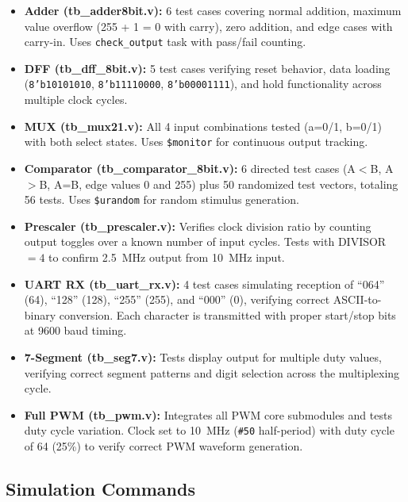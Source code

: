 \documentclass[12pt,a4paper]{article}
\begin{document}
\begin{itemize}
\item \textbf{Adder (tb\_adder8bit.v):} 6 test cases covering normal addition, maximum value overflow (255 + 1 = 0 with carry), zero addition, and edge cases with carry-in. Uses \texttt{check\_output} task with pass/fail counting.

\item \textbf{DFF (tb\_dff\_8bit.v):} 5 test cases verifying reset behavior, data loading (\texttt{8'b10101010}, \texttt{8'b11110000}, \texttt{8'b00001111}), and hold functionality across multiple clock cycles.

\item \textbf{MUX (tb\_mux21.v):} All 4 input combinations tested (a=0/1, b=0/1) with both select states. Uses \texttt{\$monitor} for continuous output tracking.

\item \textbf{Comparator (tb\_comparator\_8bit.v):} 6 directed test cases (A$<$B, A$>$B, A=B, edge values 0 and 255) plus 50 randomized test vectors, totaling 56 tests. Uses \texttt{\$urandom} for random stimulus generation.

\item \textbf{Prescaler (tb\_prescaler.v):} Verifies clock division ratio by counting output toggles over a known number of input cycles. Tests with DIVISOR${}=4$ to confirm 2.5~MHz output from 10~MHz input.

\item \textbf{UART RX (tb\_uart\_rx.v):} 4 test cases simulating reception of ``064'' (64), ``128'' (128), ``255'' (255), and ``000'' (0), verifying correct ASCII-to-binary conversion. Each character is transmitted with proper start/stop bits at 9600 baud timing.

\item \textbf{7-Segment (tb\_seg7.v):} Tests display output for multiple duty values, verifying correct segment patterns and digit selection across the multiplexing cycle.

\item \textbf{Full PWM (tb\_pwm.v):} Integrates all PWM core submodules and tests duty cycle variation. Clock set to 10~MHz (\texttt{\#50} half-period) with duty cycle of 64 (25\%) to verify correct PWM waveform generation.
\end{itemize}

\subsection{Simulation Commands}
\end{document}
